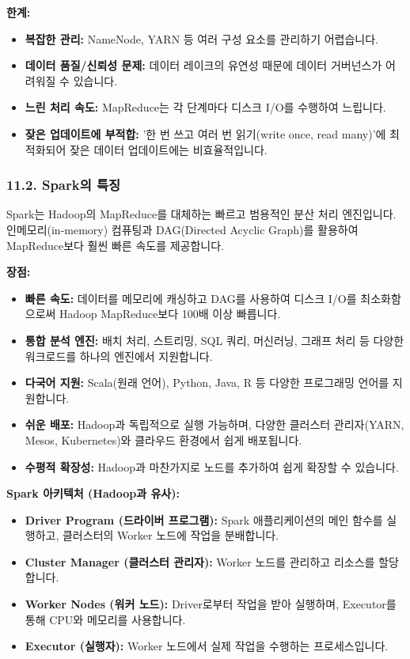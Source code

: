\documentclass[11pt,a4paper]{article}
\begin{document}
\textbf{한계:}
\begin{itemize}
    \item \textbf{복잡한 관리:} NameNode, YARN 등 여러 구성 요소를 관리하기 어렵습니다.
    \item \textbf{데이터 품질/신뢰성 문제:} 데이터 레이크의 유연성 때문에 데이터 거버넌스가 어려워질 수 있습니다.
    \item \textbf{느린 처리 속도:} MapReduce는 각 단계마다 디스크 I/O를 수행하여 느립니다.
    \item \textbf{잦은 업데이트에 부적합:} '한 번 쓰고 여러 번 읽기(write once, read many)'에 최적화되어 잦은 데이터 업데이트에는 비효율적입니다.
\end{itemize}

\subsubsection*{11.2. Spark의 특징}

\begin{summarybox}
Spark는 Hadoop의 MapReduce를 대체하는 빠르고 범용적인 분산 처리 엔진입니다. 인메모리(in-memory) 컴퓨팅과 DAG(Directed Acyclic Graph)를 활용하여 MapReduce보다 훨씬 빠른 속도를 제공합니다.
\end{summarybox}

\textbf{장점:}
\begin{itemize}
    \item \textbf{빠른 속도:} 데이터를 메모리에 캐싱하고 DAG를 사용하여 디스크 I/O를 최소화함으로써 Hadoop MapReduce보다 100배 이상 빠릅니다.
    \item \textbf{통합 분석 엔진:} 배치 처리, 스트리밍, SQL 쿼리, 머신러닝, 그래프 처리 등 다양한 워크로드를 하나의 엔진에서 지원합니다.
    \item \textbf{다국어 지원:} Scala(원래 언어), Python, Java, R 등 다양한 프로그래밍 언어를 지원합니다.
    \item \textbf{쉬운 배포:} Hadoop과 독립적으로 실행 가능하며, 다양한 클러스터 관리자(YARN, Mesos, Kubernetes)와 클라우드 환경에서 쉽게 배포됩니다.
    \item \textbf{수평적 확장성:} Hadoop과 마찬가지로 노드를 추가하여 쉽게 확장할 수 있습니다.
\end{itemize}

\textbf{Spark 아키텍처 (Hadoop과 유사):}
\begin{itemize}
    \item \textbf{Driver Program (드라이버 프로그램):} Spark 애플리케이션의 메인 함수를 실행하고, 클러스터의 Worker 노드에 작업을 분배합니다.
    \item \textbf{Cluster Manager (클러스터 관리자):} Worker 노드를 관리하고 리소스를 할당합니다.
    \item \textbf{Worker Nodes (워커 노드):} Driver로부터 작업을 받아 실행하며, Executor를 통해 CPU와 메모리를 사용합니다.
    \item \textbf{Executor (실행자):} Worker 노드에서 실제 작업을 수행하는 프로세스입니다.
\end{itemize}
\end{document}
